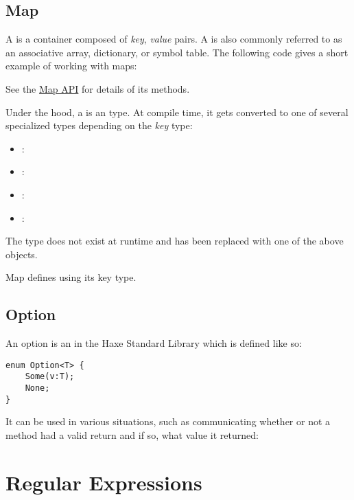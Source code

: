 \subsection{Map}
\label{std-Map}

A  is a container composed of \emph{key}, \emph{value} pairs.  A  is also commonly referred to as an associative array, dictionary, or symbol table. The following code gives a short example of working with maps:


See the \href{http://api.haxe.org/Map.html}{Map API} for details of its methods.

Under the hood, a  is an  type. At compile time, it gets converted to one of several specialized types depending on the \emph{key} type:
\begin{itemize}
	\item {}: 
	\item {}: 
	\item {}: 
	\item \type{\{\}}: 
\end{itemize}

The  type does not exist at runtime and has been replaced with one of the above objects. 

Map defines  using its key type.


\subsection{Option}
\label{std-Option}

An option is an  in the Haxe Standard Library which is defined like so:

\begin{lstlisting}
enum Option<T> {
	Some(v:T);
	None;
}
\end{lstlisting}

It can be used in various situations, such as communicating whether or not a method had a valid return and if so, what value it returned:




\section{Regular Expressions}
\label{std-regex}

